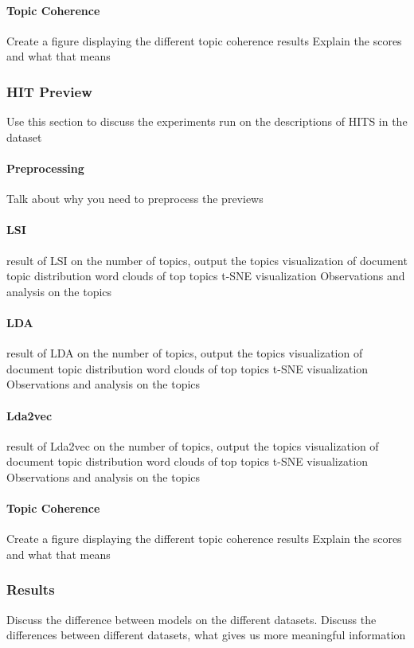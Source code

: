 \documentclass[letterpaper,12pt]{article}
\begin{document}
\paragraph{Topic Coherence}
Create a figure displaying the different topic coherence results
Explain the scores and what that means

\subsubsection{HIT Preview}
Use this section to discuss the experiments run on the descriptions of HITS in the dataset

\paragraph{Preprocessing}
Talk about why you need to preprocess the previews
\paragraph{LSI}
result of LSI on the number of topics, output the topics
visualization of document topic distribution
word clouds of top topics
t-SNE visualization
Observations and analysis on the topics

\paragraph{LDA}
result of LDA on the number of topics, output the topics
visualization of document topic distribution
word clouds of top topics
t-SNE visualization
Observations and analysis on the topics

\paragraph{Lda2vec}
result of Lda2vec on the number of topics, output the topics
visualization of document topic distribution
word clouds of top topics
t-SNE visualization
Observations and analysis on the topics

\paragraph{Topic Coherence}
Create a figure displaying the different topic coherence results
Explain the scores and what that means

\subsubsection{Results}
Discuss the difference between models on the different datasets.
Discuss the differences between different datasets, what gives us more meaningful information
\end{document}
